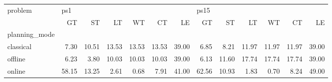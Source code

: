 \begin{tabular}{lrrrrrrrrrrrr}
\toprule
problem & \multicolumn{6}{l}{ps1} & \multicolumn{6}{l}{ps15} \\
{} &    GT &    ST &    LT &    WT &    CT &    LE &    GT &    ST &    LT &    WT &    CT &    LE \\
planning\_mode &       &       &       &       &       &       &       &       &       &       &       &       \\
\midrule
classical     &  7.30 & 10.51 & 13.53 & 13.53 & 13.53 & 39.00 &  6.85 &  8.21 & 11.97 & 11.97 & 11.97 & 39.00 \\
offline       &  6.23 &  3.80 & 10.03 & 10.03 & 10.03 & 39.00 &  6.13 & 11.60 & 17.74 & 17.74 & 17.74 & 39.00 \\
online        & 58.15 & 13.25 &  2.61 &  0.68 &  7.91 & 41.00 & 62.56 & 10.93 &  1.83 &  0.70 &  8.24 & 49.00 \\
\bottomrule
\end{tabular}
